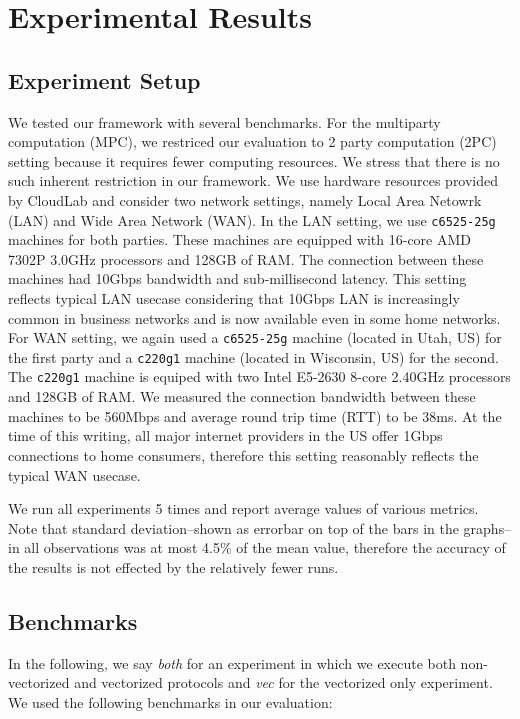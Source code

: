 \section{Experimental Results}
\label{sec:results}

\subsection{Experiment Setup}\label{sec:experiment_setup}
We tested our framework with several benchmarks. For the multiparty computation (MPC), we restriced our evaluation to 2 party computation (2PC) setting because it requires fewer computing resources. We stress that there is no such inherent restriction in our framework. We use hardware resources provided by CloudLab\cite{DuplyakinATC19} and consider two network settings, namely Local Area Netowrk (LAN) and Wide Area Network (WAN). In the LAN setting, we use {\tt c6525-25g} machines for both parties. These machines are equipped with 16-core AMD 7302P 3.0GHz processors and 128GB of RAM. The connection between these machines had 10Gbps bandwidth and sub-millisecond latency. This setting reflects typical LAN usecase considering that 10Gbps LAN is increasingly common in business networks and is now available even in some home networks. For WAN setting, we again used a {\tt c6525-25g} machine (located in Utah, US) for the first party and a {\tt c220g1} machine (located in Wisconsin, US) for the second. The {\tt c220g1} machine is equiped with two Intel E5-2630 8-core 2.40GHz processors and 128GB of RAM. We measured the connection bandwidth between these machines to be 560Mbps and average round trip time (RTT) to be 38ms. At the time of this writing, all major internet providers in the US offer 1Gbps connections to home consumers, therefore this setting reasonably reflects the typical WAN usecase.

We run all experiments 5 times and report average values of various metrics. Note that standard deviation--shown as errorbar on top of the bars in the graphs--in all observations was at most 4.5\% of the mean value, therefore the accuracy of the results is not effected by the relatively fewer runs.

\subsection{Benchmarks}\label{sec:benchmarks_description}
In the following, we say {\em both} for an experiment in which we execute both non-vectorized and vectorized protocols and {\em vec} for the vectorized only experiment. We used the following benchmarks in our evaluation:


